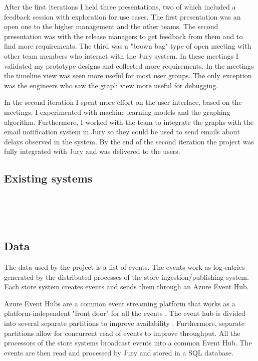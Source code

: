 After the first iterations I held three presentations, two of which included a feedback session with exploration for use cases. The first presentation was an open one to the higher management and the other teams. The second presentation was with the release managers to get feedback from them and to find more requirements. The third was a "brown bag" type of open meeting with other team members who interact with the Jury system.
In these meetings I validated my prototype designs and collected more requirements.
In the meetings the timeline view was seen more useful for most user groups.
The only exception was the engineers who saw the graph view more useful for debugging.

In the second iteration I spent more effort on the user interface, based on the meetings.
I experimented with machine learning models and the graphing algorithm.
Furthermore, I worked with the team to integrate the graphs with the email notification system in Jury so they could be used to send emails about delays observed in the system. 
By the end of the second iteration the project was fully integrated with Jury and was delivered to the users.

\subsection{Existing systems}

\\
\\
\\

\subsection{Data}
The data used by the project is a list of events. The events work as log entries generated by the distributed processes of the store ingestion/publishing system. Each store system creates events and sends them through an Azure Event Hub. 


Azure Event Hubs are a common event streaming platform that works as a platform-independent "front door" for all the events \cite{eventhubs}. 
The event hub is divided into several separate partitions to improve availability \cite{eventhubavail}.
Furthermore, separate partitions allow for concurrent read of events to improve throughput.
All the processors of the store systems broadcast events into a common Event Hub.
The events are then read and processed by Jury and stored in a SQL database.

